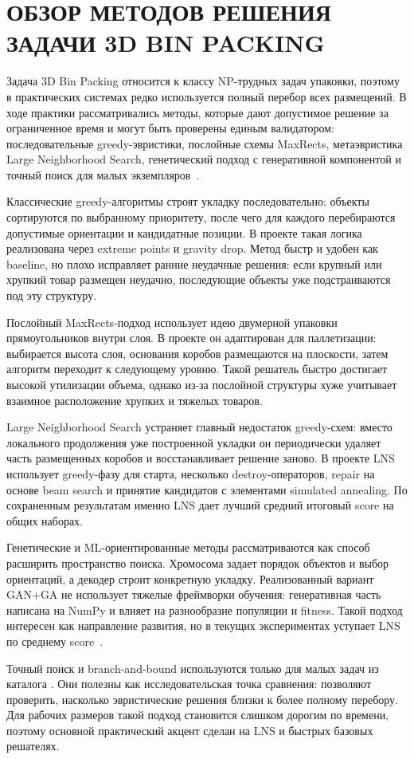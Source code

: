 \clearpage
\section[Обзор методов решения задачи 3D Bin Packing]{\centering\MakeUppercase{Обзор методов решения задачи 3D Bin Packing}}

Задача 3D Bin Packing относится к классу NP-трудных задач упаковки, поэтому в практических системах редко используется полный перебор всех размещений. В ходе практики рассматривались методы, которые дают допустимое решение за ограниченное время и могут быть проверены единым валидатором: последовательные greedy-эвристики, послойные схемы MaxRects, метаэвристика Large Neighborhood Search, генетический подход с генеративной компонентой и точный поиск для малых экземпляров~\cite{coffman1997,lodi2002,pisinger2010}.

Классические greedy-алгоритмы строят укладку последовательно: объекты сортируются по выбранному приоритету, после чего для каждого перебираются допустимые ориентации и кандидатные позиции. В проекте такая логика реализована через extreme points и gravity drop. Метод быстр и удобен как baseline, но плохо исправляет ранние неудачные решения: если крупный или хрупкий товар размещен неудачно, последующие объекты уже подстраиваются под эту структуру.

Послойный MaxRects-подход использует идею двумерной упаковки прямоугольников внутри слоя. В проекте он адаптирован для паллетизации: выбирается высота слоя, основания коробов размещаются на плоскости, затем алгоритм переходит к следующему уровню. Такой решатель быстро достигает высокой утилизации объема, однако из-за послойной структуры хуже учитывает взаимное расположение хрупких и тяжелых товаров.

Large Neighborhood Search устраняет главный недостаток greedy-схем: вместо локального продолжения уже построенной укладки он периодически удаляет часть размещенных коробов и восстанавливает решение заново. В проекте LNS использует greedy-фазу для старта, несколько destroy-операторов, repair на основе beam search и принятие кандидатов с элементами simulated annealing. По сохраненным результатам именно LNS дает лучший средний итоговый score на общих наборах.

Генетические и ML-ориентированные методы рассматриваются как способ расширить пространство поиска. Хромосома задает порядок объектов и выбор ориентаций, а декодер строит конкретную укладку. Реализованный вариант GAN+GA не использует тяжелые фреймворки обучения: генеративная часть написана на NumPy и влияет на разнообразие популяции и fitness. Такой подход интересен как направление развития, но в текущих экспериментах уступает LNS по среднему score~\cite{zhang2024}.

Точный поиск и branch-and-bound используются только для малых задач из каталога . Они полезны как исследовательская точка сравнения: позволяют проверить, насколько эвристические решения близки к более полному перебору. Для рабочих размеров такой подход становится слишком дорогим по времени, поэтому основной практический акцент сделан на LNS и быстрых базовых решателях.
